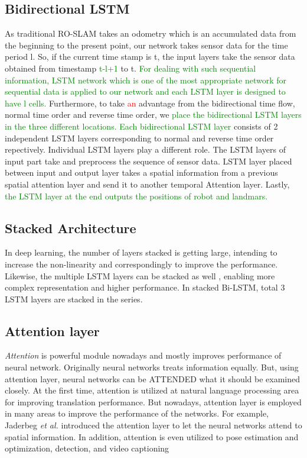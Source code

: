 \documentclass{ieeeaccess}
\begin{document}
\subsection{Bidirectional LSTM}

As traditional RO-SLAM \cite{blanco2008pure,blanco2008efficient} takes an odometry which is an accumulated data from the beginning to the present point, our network takes sensor data for the time period l. So, if the current time stamp is t, the input layers take the sensor data obtained from timestamp \textcolor{green}{t-l+1} to t. \textcolor{green}{For dealing with such sequential information, LSTM network which is one of the most appropriate network for sequential data is applied to our network and each LSTM layer is designed to have l cells.} Furthermore, to take \textcolor{red}{an} advantage from the bidirectional time flow, normal time order and reverse time order, we \textcolor{green}{place the bidirectional LSTM layers in the three different locations. Each bidirectional LSTM layer} consists of 2 independent LSTM layers corresponding to normal and reverse time order repectively. Individual LSTM layers play a different role. The LSTM layers of input part take and preprocess the sequence of sensor data. LSTM layer placed between input and output layer takes a spatial information from a previous spatial attention layer and send it to another temporal Attention layer. Lastly, \textcolor{green}{the LSTM layer at the end outputs the positions of robot and landmars.}


\subsection{Stacked Architecture}

In deep learning, the number of layers stacked is getting large, intending to increase the non-linearity and correspondingly to improve the performance. Likewise, the multiple LSTM layers can be stacked as well \cite{dyer2015transition}, enabling more complex representation and higher performance. In stacked Bi-LSTM, total 3 LSTM layers are stacked in the series. 


\subsection{Attention layer}

\textit{Attention} is powerful module nowadays and mostly improves performance of neural network. Originally neural networks treats information equally. But, using attention layer, neural networks can be ATTENDED what it should be examined closely. At the first time, attention is utilized at natural language processing area for improving translation performance\cite{luong2015effective}. But nowadays, attention layer is employed in many areas to improve the performance of the networks. For example, Jaderbeg \textit{et al.}\cite{jaderberg2015spatial} introduced the attention layer to let the neural networks attend to spatial information. In addition, attention is even utilized to pose estimation and optimization\cite{parisotto2018global}, detection\cite{zhu2018towards}, and video captioning\cite{xu2017learning} 
\end{document}
